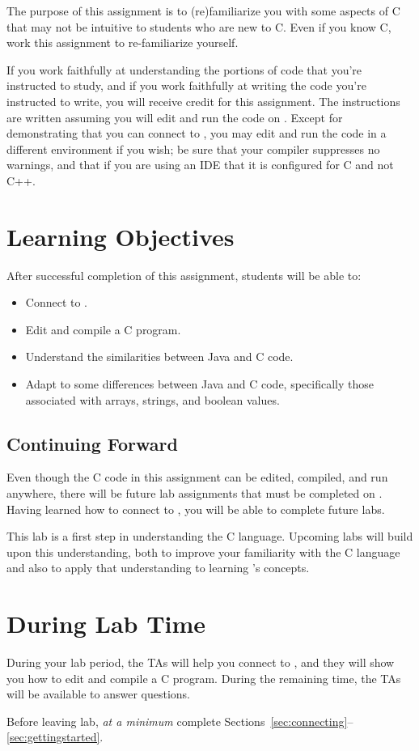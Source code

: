 The purpose of this assignment is to (re)familiarize you with some aspects of C that may not be intuitive to students who are new to C\@.
Even if you know C, work this assignment to re-familiarize yourself.

If you work faithfully at understanding the portions of code that you're instructed to study, and if you work faithfully at writing the code you're instructed to write, you will receive credit for this assignment.
The instructions are written assuming you will edit and run the code on \runtimeenvironment.
Except for demonstrating that you can connect to \runtimeenvironment, you may edit and run the code in a different environment if you wish;
be sure that your compiler suppresses no warnings, and that if you are using an IDE that it is configured for C and not C++.

\section*{Learning Objectives}

After successful completion of this assignment, students will be able to:
\begin{itemize}
    \item Connect to \runtimeenvironment.
    \item Edit and compile a C program.
    \item Understand the similarities between Java and C code.
    \item Adapt to some differences between Java and C code, specifically those
    associated with arrays, strings, and boolean values.
\end{itemize}

\subsection*{Continuing Forward}

Even though the C code in this assignment can be edited, compiled, and run anywhere, there will be future lab assignments that must be completed on \runtimeenvironment.
Having learned how to connect to \runtimeenvironment, you will be able to complete future labs.

This lab is a first step in understanding the C language.
Upcoming labs will build upon this understanding, both to improve your familiarity with the C language and also to apply that understanding to learning \coursenumber's concepts.

\section*{During Lab Time}

During your lab period, the TAs will help you connect to \runtimeenvironment, and they will show you how to edit and compile a C program.
During the remaining time, the TAs will be available to answer questions.

Before leaving lab, \textit{at a minimum} complete Sections~\ref{sec:connecting}--\ref{sec:gettingstarted}.
